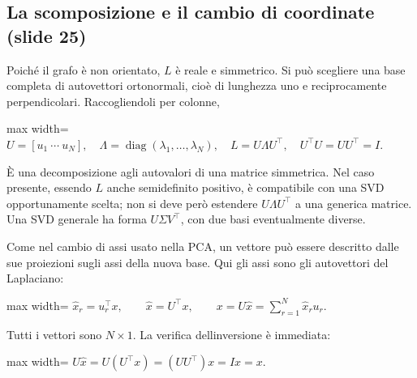 \documentclass[11pt,a4paper,oneside,openany]{book}
\begin{document}
\subsection{La scomposizione e il cambio di coordinate (slide 25)}\label{f05-r337}

Poiché il grafo è non orientato, \(L\) è reale e simmetrico. Si può scegliere una base completa di autovettori ortonormali, cioè di lunghezza uno e reciprocamente perpendicolari. Raccogliendoli per colonne,

\begin{center}
\begin{adjustbox}{max width=\linewidth}
$\displaystyle \boxed{U=[u_1\ \cdots\ u_N],\quad
\Lambda=\operatorname{diag}(\lambda_1,\ldots,\lambda_N),\quad
L=U\Lambda U^\top,\quad U^\top U=UU^\top=I.}$
\end{adjustbox}
\end{center}

È una decomposizione agli autovalori di una matrice simmetrica. Nel caso presente, essendo \(L\) anche semidefinito positivo, è compatibile con una SVD opportunamente scelta; non si deve però estendere \(U\Lambda U^\top\) a una generica matrice. Una SVD generale ha forma \(U\Sigma V^\top\), con due basi eventualmente diverse.

Come nel cambio di assi usato nella PCA, un vettore può essere descritto dalle sue proiezioni sugli assi della nuova base. Qui gli assi sono gli autovettori del Laplaciano:

\begin{center}
\begin{adjustbox}{max width=\linewidth}
$\displaystyle \widehat x_r=u_r^\top x,\qquad \widehat x=U^\top x,\qquad
x=U\widehat x=\sum_{r=1}^N\widehat x_ru_r.$
\end{adjustbox}
\end{center}

Tutti i vettori sono \(N\times1\). La verifica dell\textquotesingle inversione è immediata:

\begin{center}
\begin{adjustbox}{max width=\linewidth}
$\displaystyle U\widehat x=U(U^\top x)=(UU^\top)x=Ix=x.$
\end{adjustbox}
\end{center}
\end{document}
